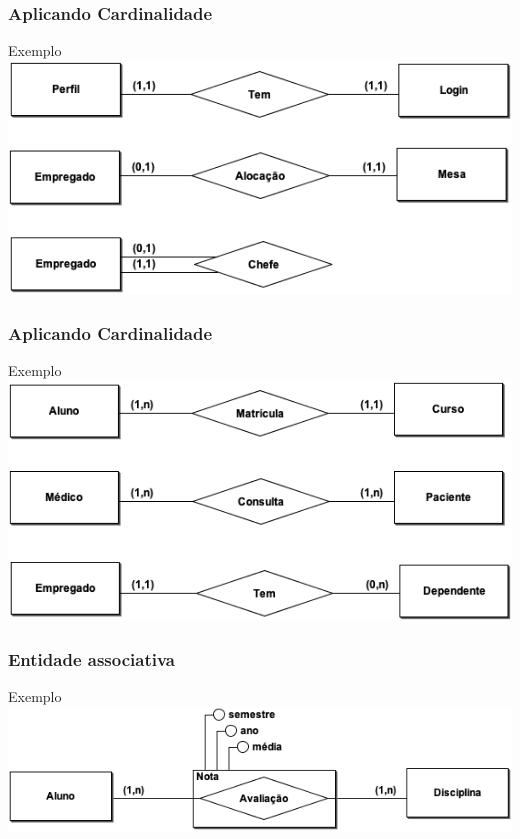 \documentclass{beamer}
\begin{document}
\begin{frame}
\frametitle{Aplicando Cardinalidade}

\begin{exampleblock}{Exemplo}
	\centering
	\includegraphics[scale=2.5]{img/cardinalidade1}
\end{exampleblock}
\end{frame}

\begin{frame}
\frametitle{Aplicando Cardinalidade}

\begin{exampleblock}{Exemplo}
	\centering
	\includegraphics[scale=2.5]{img/cardinalidade2}
\end{exampleblock}
\end{frame}

\begin{frame}
\frametitle{Entidade associativa}

\begin{exampleblock}{Exemplo}
	\centering
	\includegraphics[scale=2.3]{img/entidade-associativa}
\end{exampleblock}
\end{frame}
\end{document}
